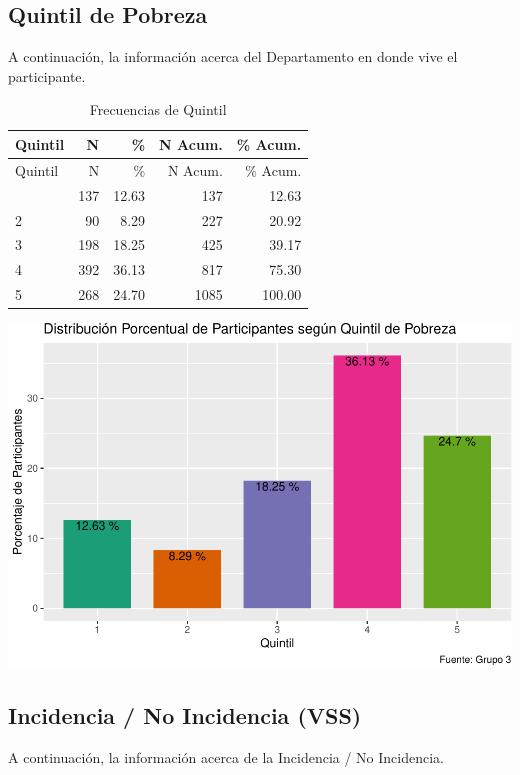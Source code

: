 \documentclass[
]{article}
\begin{document}
\subsection{Quintil de Pobreza}\label{quintil-de-pobreza}

A continuación, la información acerca del Departamento en donde vive el
participante.

\begin{longtable}[]{@{}lrrrr@{}}
\caption{Frecuencias de Quintil}\tabularnewline
\toprule\noalign{}
Quintil & N & \% & N Acum. & \% Acum. \\
\midrule\noalign{}
\endfirsthead
\toprule\noalign{}
Quintil & N & \% & N Acum. & \% Acum. \\
\midrule\noalign{}
\endhead
\bottomrule\noalign{}
\endlastfoot
1 & 137 & 12.63 & 137 & 12.63 \\
2 & 90 & 8.29 & 227 & 20.92 \\
3 & 198 & 18.25 & 425 & 39.17 \\
4 & 392 & 36.13 & 817 & 75.30 \\
5 & 268 & 24.70 & 1085 & 100.00 \\
\end{longtable}

\includegraphics{Info_Dinix_02_files/figure-latex/30_Quintus-1.pdf}

\subsection{Incidencia / No Incidencia
(VSS)}\label{incidencia-no-incidencia-vss}

A continuación, la información acerca de la Incidencia / No Incidencia.
\end{document}
